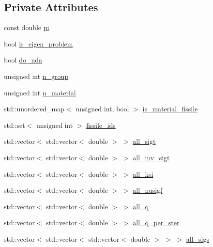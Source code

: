 \subsection*{Private Attributes}
\begin{DoxyCompactItemize}
\item 
const double \hyperlink{class_material_properties_a28173c461cf9a74c3b0ebe0f51c386d3}{pi}
\item 
bool \hyperlink{class_material_properties_a2193d0f80fcfbba74a2e84fae0518097}{is\+\_\+eigen\+\_\+problem}
\item 
bool \hyperlink{class_material_properties_a911d589ba4b11eee87ce5748b760437a}{do\+\_\+nda}
\item 
unsigned int \hyperlink{class_material_properties_a4cae7eee21ea5ed5246765c049caf58b}{n\+\_\+group}
\item 
unsigned int \hyperlink{class_material_properties_a3bc9713ea94f32fb93d60f2a726e4f2d}{n\+\_\+material}
\item 
std\+::unordered\+\_\+map$<$ unsigned int, bool $>$ \hyperlink{class_material_properties_a232e0fa7b96e2d93597e4dd6839b5223}{is\+\_\+material\+\_\+fissile}
\item 
std\+::set$<$ unsigned int $>$ \hyperlink{class_material_properties_a272a39984c2c2a5ca277787ee22f412d}{fissile\+\_\+ids}
\item 
std\+::vector$<$ std\+::vector$<$ double $>$ $>$ \hyperlink{class_material_properties_ac2a59b00e3be0e775249354182ae08a4}{all\+\_\+sigt}
\item 
std\+::vector$<$ std\+::vector$<$ double $>$ $>$ \hyperlink{class_material_properties_a9cf448a469e554386e3313d7db0ed4b5}{all\+\_\+inv\+\_\+sigt}
\item 
std\+::vector$<$ std\+::vector$<$ double $>$ $>$ \hyperlink{class_material_properties_ae753809af30d2f6a3b0c7375555e68bb}{all\+\_\+ksi}
\item 
std\+::vector$<$ std\+::vector$<$ double $>$ $>$ \hyperlink{class_material_properties_ac20f8acc8fb9dd7ef9805eff006f4710}{all\+\_\+nusigf}
\item 
std\+::vector$<$ std\+::vector$<$ double $>$ $>$ \hyperlink{class_material_properties_a63087272811561aa476e594b6aa6f4a9}{all\+\_\+q}
\item 
std\+::vector$<$ std\+::vector$<$ double $>$ $>$ \hyperlink{class_material_properties_a6ca548f222ef27140c7fc1876c97e6aa}{all\+\_\+q\+\_\+per\+\_\+ster}
\item 
std\+::vector$<$ std\+::vector$<$ std\+::vector$<$ double $>$ $>$ $>$ \hyperlink{class_material_properties_a786a421a5a5c61a203b7517e7bafa829}{all\+\_\+sigs}

\end{DoxyCompactItemize}
